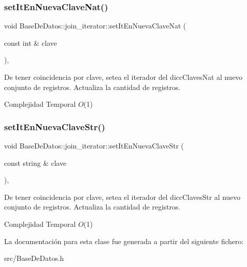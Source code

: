 \subsubsection{\texorpdfstring{set\+It\+En\+Nueva\+Clave\+Nat()}{setItEnNuevaClaveNat()}}
{\footnotesize\ttfamily void Base\+De\+Datos\+::join\+\_\+iterator\+::set\+It\+En\+Nueva\+Clave\+Nat (\begin{DoxyParamCaption}\item[{const int \&}]{clave }\end{DoxyParamCaption})\hspace{0.3cm}{\ttfamily [inline]}, {\ttfamily [private]}}



De tener coincidencia por clave, setea el iterador del dicc\+Claves\+Nat al nuevo conjunto de registros. Actualiza la cantidad de registros. 


\begin{DoxyDescription}
\item[Complejidad Temporal]$O$(1)
\end{DoxyDescription}\mbox{\label{classBaseDeDatos_1_1join__iterator_af75048242013b8fac69633c2626715df}} 
\subsubsection{\texorpdfstring{set\+It\+En\+Nueva\+Clave\+Str()}{setItEnNuevaClaveStr()}}
{\footnotesize\ttfamily void Base\+De\+Datos\+::join\+\_\+iterator\+::set\+It\+En\+Nueva\+Clave\+Str (\begin{DoxyParamCaption}\item[{const string \&}]{clave }\end{DoxyParamCaption})\hspace{0.3cm}{\ttfamily [inline]}, {\ttfamily [private]}}



De tener coincidencia por clave, setea el iterador del dicc\+Claves\+Str al nuevo conjunto de registros. Actualiza la cantidad de registros. 


\begin{DoxyDescription}
\item[Complejidad Temporal]$O$(1)
\end{DoxyDescription}

La documentación para esta clase fue generada a partir del siguiente fichero\+:\begin{DoxyCompactItemize}
\item 
src/Base\+De\+Datos.\+h\end{DoxyCompactItemize}
